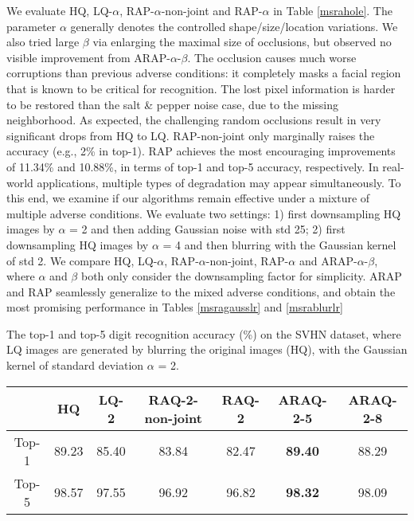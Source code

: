 \documentclass[10pt,twocolumn,twoside]{IEEEtran} %
\begin{document}
We evaluate HQ, LQ-$\alpha$, RAP-$\alpha$-non-joint and RAP-$\alpha$ in Table \ref{msrahole}. The parameter $\alpha$ generally denotes the controlled shape/size/location variations. We also tried large $\beta$ via enlarging the maximal size of occlusions, but observed no visible improvement from ARAP-$\alpha$-$\beta$. The occlusion causes much worse corruptions than previous adverse conditions: it completely masks a facial region that is known to be critical for recognition. The lost pixel information is harder to be restored than the salt \& pepper noise case, due to the missing neighborhood. As expected, the challenging random occlusions result in very significant drops from HQ to LQ. RAP-non-joint only marginally raises the accuracy (e.g., 2\% in top-1). RAP achieves the most encouraging improvements of 11.34\% and 10.88\%, in terms of top-1 and top-5 accuracy, respectively.
In real-world applications, multiple types of degradation may appear simultaneously.
To this end, we examine if our algorithms remain effective under a mixture of multiple adverse conditions.  We evaluate two settings: 1) first downsampling HQ images by $\alpha$ = 2 and then adding Gaussian noise with std 25; 2) first downsampling HQ images by $\alpha$ = 4 and then blurring with the Gaussian kernel of std 2. We compare HQ, LQ-$\alpha$, RAP-$\alpha$-non-joint, RAP-$\alpha$ and ARAP-$\alpha$-$\beta$, where $\alpha$ and $\beta$ both only consider the downsampling factor for simplicity. ARAP and RAP seamlessly generalize to the mixed adverse conditions, and obtain the most promising performance in Tables \ref{msragausslr} and \ref{msrablurlr}%
	\fontsize{10pt}{12pt}\selectfont
	\caption{The top-1 and top-5 digit recognition accuracy (\%) on the SVHN dataset, where LQ images are generated by blurring the original images (HQ), with the Gaussian kernel of standard deviation $\alpha$ = 2.}	
	\begin{center}
		\begin{tabular}{c|c|c|c|c|c|c}
			\hline
			& HQ & LQ-2 & RAQ-2-non-joint & RAQ-2 & ARAQ-2-5 & ARAQ-2-8 \\ 
			\hline
			\hline
			Top-1 & 89.23 & 85.40 & 83.84 & 82.47 & \textbf{89.40} & 88.29 \\
			Top-5 & 98.57 & 97.55 & 96.92 & 96.82 &  \textbf{98.32} & 98.09 \\ \hline
		\end{tabular}
	\end{center}
	
\end{document}
